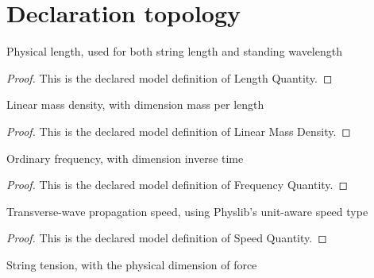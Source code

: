 \section{Declaration topology}
\begin{definition}
  \label{def:physics:phyx-mini-0182:phyxminiproblems-problemphyxmini0182-lengthquantity}
  Physical length, used for both string length and standing wavelength
\end{definition}
\begin{proof}
  This is the declared model definition of Length Quantity.
\end{proof}
\begin{definition}
  \label{def:physics:phyx-mini-0182:phyxminiproblems-problemphyxmini0182-linearmassdensity}
  Linear mass density, with dimension mass per length
\end{definition}
\begin{proof}
  This is the declared model definition of Linear Mass Density.
\end{proof}
\begin{definition}
  \label{def:physics:phyx-mini-0182:phyxminiproblems-problemphyxmini0182-frequencyquantity}
  Ordinary frequency, with dimension inverse time
\end{definition}
\begin{proof}
  This is the declared model definition of Frequency Quantity.
\end{proof}
\begin{definition}
  \label{def:physics:phyx-mini-0182:phyxminiproblems-problemphyxmini0182-speedquantity}
  Transverse-wave propagation speed, using Physlib's unit-aware speed type
\end{definition}
\begin{proof}
  This is the declared model definition of Speed Quantity.
\end{proof}
\begin{definition}
  \label{def:physics:phyx-mini-0182:phyxminiproblems-problemphyxmini0182-tensionquantity}
  String tension, with the physical dimension of force
\end{definition}
